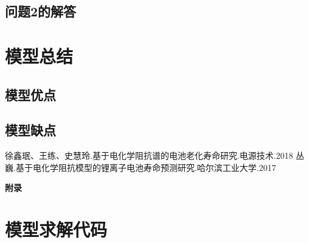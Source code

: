 \documentclass{cumcm}
\begin{document}
\subsection{问题2的解答}


\section{模型总结}

\subsection{模型优点}

\subsection{模型缺点}



\begin{thebibliography}{99}
徐鑫珉、王练、史慧玲.基于电化学阻抗谱的电池老化寿命研究.电源技术.2018
丛巍.基于电化学阻抗模型的锂离子电池寿命预测研究.哈尔滨工业大学.2017
\end{thebibliography}

\newpage
\appendix
\textbf{附录}
\section{模型求解代码}
\end{document}
